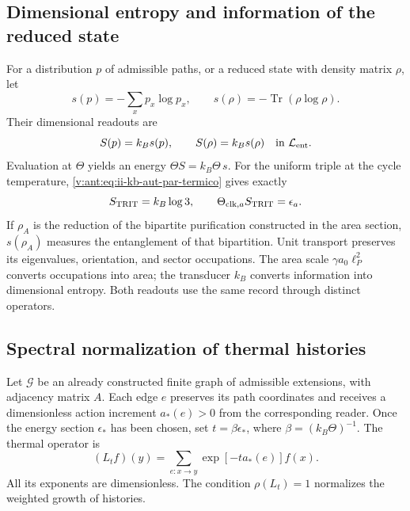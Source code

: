 \subsection{Dimensional entropy and information of the reduced state}

For a distribution \(p\) of admissible paths, or a reduced state
with density matrix \(\rho\), let
\[
 s(p)=-\sum_xp_x\log p_x,\qquad
 s(\rho)=-\operatorname{Tr}(\rho\log\rho).
\]
Their dimensional readouts are
\begin{equation}
 S(p)=k_Bs(p),\qquad S(\rho)=k_Bs(\rho)
 \quad\text{in }\mathcal L_{\rm ent}.
 \label{v:ant:eq:ii-kb-aut-entropia}
\end{equation}
Evaluation at \(\Theta\) yields an energy
\(\Theta S=k_B\Theta\,s\). For the uniform triple at the cycle
temperature, \eqref{v:ant:eq:ii-kb-aut-par-termico} gives exactly
\[
 S_{\rm TRIT}=k_B\log3,\qquad
 \Theta_{{\rm clk},a}S_{\rm TRIT}=\epsilon_a.
\]
If \(\rho_A\) is the reduction of the bipartite purification
constructed in the area section, \(s(\rho_A)\) measures the entanglement
of that bipartition. Unit transport preserves its
eigenvalues, orientation, and sector occupations. The area scale
\(\gamma a_0\ell_P^2\) converts occupations into area; the
transducer \(k_B\) converts information into dimensional entropy.
Both readouts use the same record through distinct operators.

\subsection{Spectral normalization of thermal histories}

Let \(\mathcal G\) be an already constructed finite graph of admissible extensions,
with adjacency matrix \(A\). Each edge \(e\) preserves
its path coordinates and receives a dimensionless action increment
\(a_*(e)>0\) from the corresponding reader. Once the energy section
\(\epsilon_*\) has been chosen, set \(t=\beta\epsilon_*\), where
\(\beta=(k_B\Theta)^{-1}\). The thermal operator is
\begin{equation}
 (L_tf)(y)=\sum_{e:x\to y}\exp[-t a_*(e)]f(x).
 \label{v:ant:eq:ii-kb-aut-operador}
\end{equation}
All its exponents are dimensionless. The condition
\(\rho(L_t)=1\) normalizes the weighted growth of histories.

